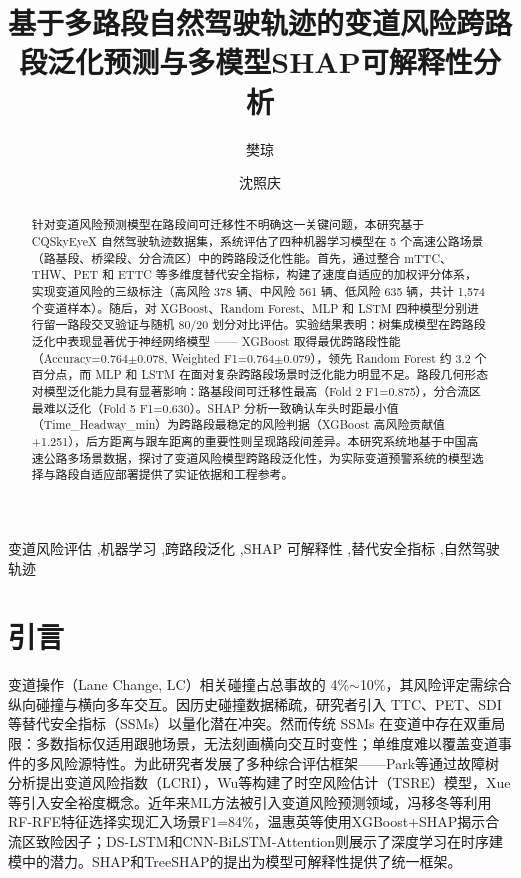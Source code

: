 \documentclass[preprint,review,12pt,a4paper]{elsarticle}
\begin{document}
\begin{frontmatter}

\title{基于多路段自然驾驶轨迹的变道风险跨路段泛化预测与多模型SHAP可解释性分析}

\author{樊琼}
\author{沈照庆}

\begin{abstract}
针对变道风险预测模型在路段间可迁移性不明确这一关键问题，本研究基于 CQSkyEyeX 自然驾驶轨迹数据集，系统评估了四种机器学习模型在 5 个高速公路场景（路基段、桥梁段、分合流区）中的跨路段泛化性能。首先，通过整合 mTTC、THW、PET 和 ETTC 等多维度替代安全指标，构建了速度自适应的加权评分体系，实现变道风险的三级标注（高风险 378 辆、中风险 561 辆、低风险 635 辆，共计 1,574 个变道样本）。随后，对 XGBoost、Random Forest、MLP 和 LSTM 四种模型分别进行留一路段交叉验证与随机 80/20 划分对比评估。实验结果表明：树集成模型在跨路段泛化中表现显著优于神经网络模型 —— XGBoost 取得最优跨路段性能（Accuracy=0.764$\pm$0.078, Weighted F1=0.764$\pm$0.079），领先 Random Forest 约 3.2 个百分点，而 MLP 和 LSTM 在面对复杂跨路段场景时泛化能力明显不足。路段几何形态对模型泛化能力具有显著影响：路基段间可迁移性最高（Fold 2 F1=0.875），分合流区最难以泛化（Fold 5 F1=0.630）。SHAP 分析一致确认车头时距最小值（Time\_Headway\_min）为跨路段最稳定的风险判据（XGBoost 高风险贡献值 +1.251），后方距离与跟车距离的重要性则呈现路段间差异。本研究系统地基于中国高速公路多场景数据，探讨了变道风险模型跨路段泛化性，为实际变道预警系统的模型选择与路段自适应部署提供了实证依据和工程参考。
\end{abstract}

\begin{keyword}
变道风险评估 \sep 机器学习 \sep 跨路段泛化 \sep SHAP 可解释性 \sep 替代安全指标 \sep 自然驾驶轨迹
\end{keyword}

\end{frontmatter}

\section{引言}

变道操作（Lane Change, LC）相关碰撞占总事故的 4\%$\sim$10\%\cite{C01,C02}，其风险评定需综合纵向碰撞与横向多车交互\cite{C03}。因历史碰撞数据稀疏，研究者引入 TTC\cite{C05}、PET\cite{C04}、SDI\cite{C06}等替代安全指标（SSMs）以量化潜在冲突。然而传统 SSMs 在变道中存在双重局限：多数指标仅适用跟驰场景，无法刻画横向交互时变性\cite{C03,C07}；单维度难以覆盖变道事件的多风险源特性\cite{C01}。为此研究者发展了多种综合评估框架——Park等\cite{C08}通过故障树分析提出变道风险指数（LCRI），Wu等\cite{C03}构建了时空风险估计（TSRE）模型，Xue等\cite{C02}引入安全裕度概念。近年来ML方法被引入变道风险预测领域，冯移冬等\cite{C09}利用RF-RFE特征选择实现汇入场景F1=84\%，温惠英等\cite{C10}使用XGBoost+SHAP揭示合流区致险因子；DS-LSTM\cite{C11}和CNN-BiLSTM-Attention\cite{C12}则展示了深度学习在时序建模中的潜力。SHAP\cite{C13}和TreeSHAP\cite{C14}的提出为模型可解释性提供了统一框架。
\end{document}
